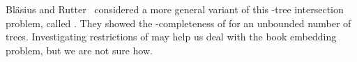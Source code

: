 Bl\"asius and Rutter~\cite{Blasius11} considered a more general variant of this \PQ-tree intersection problem, called \probPQ. They showed the
\NP-completeness of \probPQ for an unbounded number of trees. 
Investigating restrictions of \probPQ
may help us deal with the book embedding problem, but we are not sure how.
